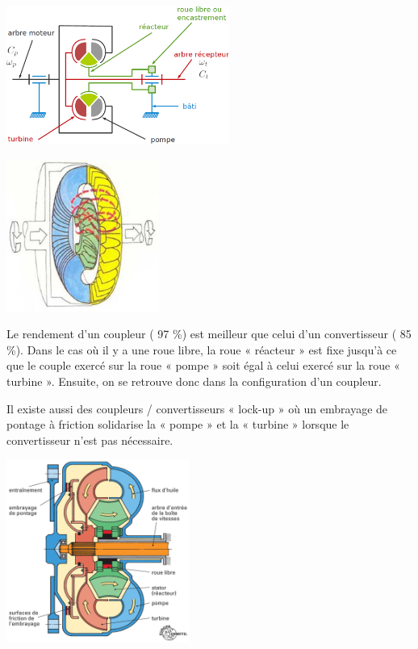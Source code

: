 \documentclass[11pt,oneside]{article}
\begin{document}
\begin{minipage}[c]{.45\linewidth}
\begin{center}
\includegraphics[height=4.5cm]{png/fig_27}
\end{center}
\end{minipage} \hfill
\begin{minipage}[c]{.45\linewidth}
\begin{center}
\includegraphics[height=5cm]{png/fig_28}
\end{center}
\end{minipage}


\begin{minipage}[c]{.5\linewidth}
Le rendement d’un coupleur ( 97 \%) est meilleur que celui d’un convertisseur ( 85 \%). Dans le cas où il y a une roue libre, la roue « réacteur » est fixe jusqu’à ce que le couple exercé sur la roue « pompe » soit égal à celui exercé sur la roue « turbine ». Ensuite, on se retrouve donc dans la configuration d’un coupleur.

Il existe aussi des coupleurs / convertisseurs « lock-up » où un embrayage de pontage à friction solidarise la « pompe » et la « turbine » lorsque le convertisseur n’est pas nécessaire.


\end{minipage} \hfill
\begin{minipage}[c]{.45\linewidth}
\begin{center}
\includegraphics[height=6cm]{png/fig_29}
\end{center}
\end{minipage}
\end{document}
